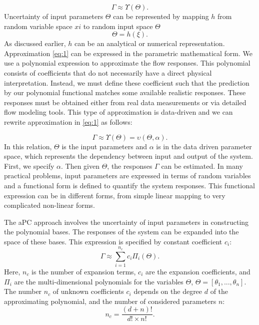 \begin{equation}
  \Gamma\approx\Upsilon(\Theta).
  \label{eq:1}
\end{equation} 
%
Uncertainty of input parameters $\Theta$ can be represented by mapping $h$ from
random variable space $xi$ to random input space $\Theta$%
\begin{equation}
  \Theta=h(\xi).
  \label{eq:rand}
\end{equation} As discussed earlier, $h$ can be an analytical or numerical
representation.
%
Approximation \ref{eq:1} can be expressed in the parametric mathematical form.
We use a polynomial expression to approximate the flow responses. This
polynomial consists of coefficients that do not necessarily have a direct
physical interpretation. Instead, we must define these coefficient such that
the prediction by our polynomial functional matches some available realistic
responses. These responses must be obtained either from real data measurements
or via detailed flow modeling tools. This type of approximation is data-driven
and we can rewrite approximation in \ref{eq:1} as follows:

\begin{equation}
  \Gamma\approx\Upsilon(\Theta)=\upsilon(\Theta,\alpha).
  \label{eq:parm}
\end{equation} In this relation, $\Theta$ is the input parameters and $\alpha$
is in the data driven parameter space, which represents the dependency between
input and output of the system. First, we specify $\alpha$. Then given
$\Theta$, the responses $\Gamma$ can be estimated. In many practical problems,
input parameters are expressed in terms of random variables and a functional
form is defined to quantify the system responses. This functional expression
can be in different forms, from simple linear mapping to very complicated
non-linear forms.

The aPC approach involves the uncertainty of input parameters in constructing
the polynomial bases. The responses of the system can be expanded into the
space of these bases. This expression is specified by constant coefficient
$c_i$:
%
\begin{equation}
\Gamma\approx\underset{i=1}{\overset{n_c}{\sum}}c_{i}\Pi_{i}(\Theta).
  \label{eq:exp}
\end{equation} Here, $n_c$ is the number of expansion terms, $c_{i}$ are the
expansion coefficients, and
$\Pi_{i}$ are the multi-dimensional polynomials for the variables
$\Theta$, $\Theta=[\theta_{1},...,\theta_{n}]$. The number $n_c$ of unknown
coefficients $c_{i}$ depends on the degree $d$ of the approximating polynomial,
and the number of considered parameters $n$:
%
\begin{equation}
 n_c=\frac{(d+n)!}{d!\times n!}.
 \label{eq:np}
\end{equation}
%

